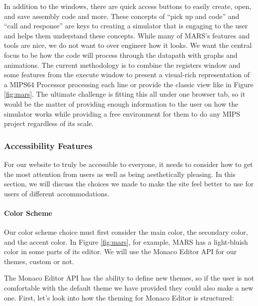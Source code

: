 \documentclass[
    paper=letter,
    parskip=half,
    fontsize=12pt,
    titlepage=firstiscover,
    toc=bibliography,
    numbers=endperiod
]{scrartcl}
\begin{document}
In addition to the windows, there are quick access buttons to easily
create, open, and save assembly code and more. These concepts of ``pick
up and code'' and ``call and response'' are keys to creating a simulator
that is engaging to the user and helps them understand these concepts.
While many of MARS's features and tools are nice, we do not want to over
engineer how it looks. We want the central focus to be how the code will
process through the datapath with graphs and animations. The current
methodology is to combine the registers window and some features from
the execute window to present a visual-rich representation of a MIPS64
Processor processing each line or provide the classic view like in
Figure \ref{fig:mars}. The ultimate challenge is fitting this all under
one browser tab, so it would be the matter of providing enough
information to the user on how the simulator works while providing a
free environment for them to do any MIPS project regardless of its
scale.

\subsubsection{Accessibility Features}
\label{subsec:accessibility-features}

For our website to truly be accessible to everyone, it needs to consider
how to get the most attention from users as well as being aesthetically
pleasing. In this section, we will discuss the choices we made to make
the site feel better to use for users of different accommodations.

\paragraph{Color Scheme}

Our color scheme choice must first consider the main color, the
secondary color, and the accent color. In Figure \ref{fig:mars}, for
example, MARS has a light-bluish color in some parts of its editor. We
will use the Monaco Editor API for our themes, custom or not.

The Monaco Editor API has the ability to define new themes, so if the
user is not comfortable with the default theme we have provided they
could also make a new one. First, let's look into how the theming for
Monaco Editor is structured:
\end{document}
